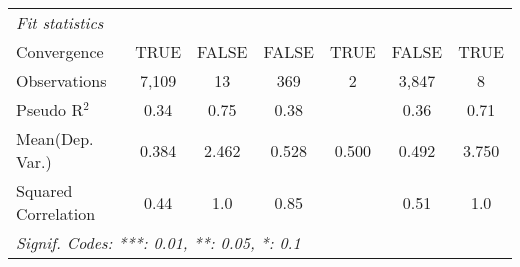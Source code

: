 \begin{tabular}{lcccccc}
   \midrule
   \emph{Fit statistics}\\
   Convergence                                                &TRUE          & FALSE         & FALSE         & TRUE & FALSE   & TRUE\\  
   Observations                                               & 7,109        & 13            & 369           & 2    & 3,847   & 8\\  
   Pseudo R$^2$                                               & 0.34         & 0.75          & 0.38          &      & 0.36    & 0.71\\  
Mean(Dep. Var.) & 0.384 & 2.462 & 0.528 & 0.500 & 0.492 & 3.750 \\
   Squared Correlation                                        & 0.44         & 1.0           & 0.85          &      & 0.51    & 1.0\\  
   \midrule \midrule
   \multicolumn{7}{l}{\emph{Signif. Codes: ***: 0.01, **: 0.05, *: 0.1}}\\
\end{tabular}
\par\endgroup
